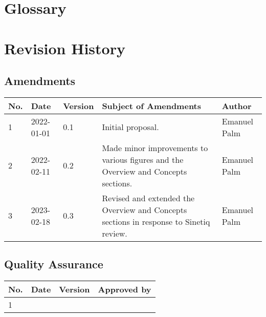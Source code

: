 \documentclass[a4paper]{arrowhead}
\begin{document}
\section{Glossary}
\label{sec:glossary}


\renewcommand{\bibsection}{\section{References}\label{sec:references}}



\newpage

\section{Revision History}
\label{sec:revision}

\subsection{Amendments}

\noindent\begin{tabularx}{\textwidth}{| p{1cm} | p{2cm} | p{1.25cm} | X | p{4cm} |} \hline
\rowcolor{gray!33} No. & Date & Version & Subject of Amendments & Author \\ \hline

1 & 2022-01-01 & 0.1 & Initial proposal. & Emanuel Palm \\ \hline
2 & 2022-02-11 & 0.2 & Made minor improvements to various figures and the Overview and Concepts sections. & Emanuel Palm \\ \hline
3 & 2023-02-18 & 0.3 & Revised and extended the Overview and Concepts sections in response to Sinetiq review. & Emanuel Palm \\ \hline

\end{tabularx}

\subsection{Quality Assurance}

\noindent\begin{tabularx}{\textwidth}{| p{1cm} | p{2cm} | p{1.25cm} | X |} \hline
\rowcolor{gray!33} No. & Date & Version & Approved by \\ \hline

1 & & & \\ \hline

\end{tabularx}
\end{document}
